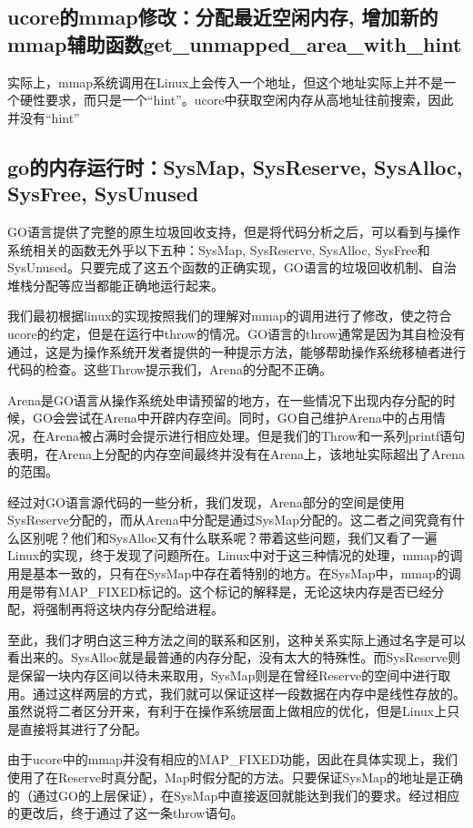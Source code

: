 \documentclass{article}
\begin{document}
\subsection{ucore的mmap修改：分配最近空闲内存, 增加新的mmap辅助函数get\_unmapped\_area\_with\_hint}
实际上，mmap系统调用在Linux上会传入一个地址，但这个地址实际上并不是一个硬性要求，而只是一个“hint”。ucore中获取空闲内存从高地址往前搜索，因此并没有“hint”

\subsection{go的内存运行时：SysMap, SysReserve, SysAlloc, SysFree, SysUnused}
GO语言提供了完整的原生垃圾回收支持，但是将代码分析之后，可以看到与操作系统相关的函数无外乎以下五种：SysMap, SysReserve, SysAlloc, SysFree和SysUnused。只要完成了这五个函数的正确实现，GO语言的垃圾回收机制、自治堆栈分配等应当都能正确地运行起来。

我们最初根据linux的实现按照我们的理解对mmap的调用进行了修改，使之符合ucore的约定，但是在运行中throw的情况。GO语言的throw通常是因为其自检没有通过，这是为操作系统开发者提供的一种提示方法，能够帮助操作系统移植者进行代码的检查。这些Throw提示我们，Arena的分配不正确。

Arena是GO语言从操作系统处申请预留的地方，在一些情况下出现内存分配的时候，GO会尝试在Arena中开辟内存空间。同时，GO自己维护Arena中的占用情况，在Arena被占满时会提示进行相应处理。但是我们的Throw和一系列printf语句表明，在Arena上分配的内存空间最终并没有在Arena上，该地址实际超出了Arena的范围。

经过对GO语言源代码的一些分析，我们发现，Arena部分的空间是使用SysReserve分配的，而从Arena中分配是通过SysMap分配的。这二者之间究竟有什么区别呢？他们和SysAlloc又有什么联系呢？带着这些问题，我们又看了一遍Linux的实现，终于发现了问题所在。Linux中对于这三种情况的处理，mmap的调用是基本一致的，只有在SysMap中存在着特别的地方。在SysMap中，mmap的调用是带有MAP\_FIXED标记的。这个标记的解释是，无论这块内存是否已经分配，将强制再将这块内存分配给进程。

至此，我们才明白这三种方法之间的联系和区别，这种关系实际上通过名字是可以看出来的。SysAlloc就是最普通的内存分配，没有太大的特殊性。而SysReserve则是保留一块内存区间以待未来取用，SysMap则是在曾经Reserve的空间中进行取用。通过这样两层的方式，我们就可以保证这样一段数据在内存中是线性存放的。虽然说将二者区分开来，有利于在操作系统层面上做相应的优化，但是Linux上只是直接将其进行了分配。

由于ucore中的mmap并没有相应的MAP\_FIXED功能，因此在具体实现上，我们使用了在Reserve时真分配，Map时假分配的方法。只要保证SysMap的地址是正确的（通过GO的上层保证），在SysMap中直接返回就能达到我们的要求。经过相应的更改后，终于通过了这一条throw语句。
\end{document}
